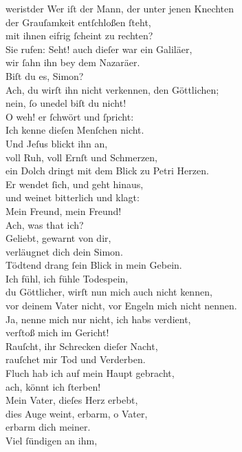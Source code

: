 \documentclass[shorttitlesize=55,tocstyle=ref-genre]{ees}
\begin{document}
{\begin{movement}{weristder}
  \voice[Alto]
  Wer iſt der Mann, der unter jenen Knechten\\
  der Grauſamkeit entſchloßen ſteht,\\
  mit ihnen eifrig ſcheint zu rechten?\\
  Sie rufen: Seht! auch dieſer war ein Galiläer,\\
  wir ſahn ihn bey dem Nazaräer.\\
  Biſt du es, Simon?\\
  Ach, du wirſt ihn nicht verkennen, den Göttlichen;\\
  nein, ſo unedel biſt du nicht!\\
  O weh! er ſchwört und ſpricht:\\
  Ich kenne dieſen Menſchen nicht.\\
  Und Jeſus blickt ihn an,\\
  voll Ruh, voll Ernſt und Schmerzen,\\
  ein Dolch dringt mit dem Blick zu Petri Herzen.\\
  Er wendet ſich, und geht hinaus,\\
  und weinet bitterlich und klagt:\\
  Mein Freund, mein Freund!\\
  Ach, was that ich?\\
  Geliebt, gewarnt von dir,\\
  verläugnet dich dein Simon.\\
  Tödtend drang ſein Blick in mein Gebein.\\
  Ich fühl, ich fühle Todespein,\\
  du Göttlicher, wirſt nun mich auch nicht kennen,\\
  vor deinem Vater nicht, vor Engeln mich nicht nennen.\\
  Ja, nenne mich nur nicht, ich habs verdient,\\
  verſtoß mich im Gericht!\\
  Rauſcht, ihr Schrecken dieſer Nacht,\\
  rauſchet mir Tod und Verderben.\\
  Fluch hab ich auf mein Haupt gebracht,\\
  ach, könnt ich ſterben!\\
  Mein Vater, dieſes Herz erbebt,\\
  dies Auge weint, erbarm, o Vater,\\
  erbarm dich meiner.\\
  Viel ſündigen an ihm,\\

\end{movement}}
\end{document}
